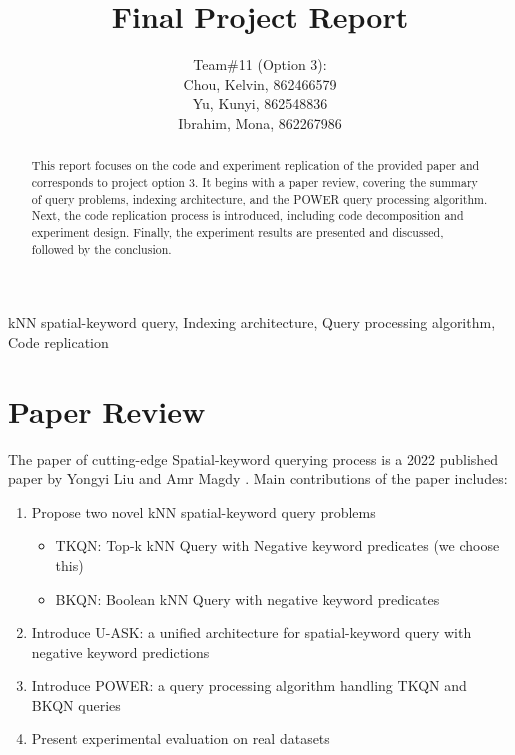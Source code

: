\documentclass[]{IEEEphot}
\begin{document}
\title{Final Project Report}

\author{
    Team\#11 (Option 3):\\
    Chou, Kelvin, 862466579\\
    Yu, Kunyi, 862548836\\
    Ibrahim, Mona, 862267986
}

\maketitle


\begin{abstract}
    This report focuses on the code and experiment replication of the provided paper \cite{ref1-original-paper} and corresponds to project option 3. It begins with a paper review, covering the summary of query problems, indexing architecture, and the POWER query processing algorithm. Next, the code replication process is introduced, including code decomposition and experiment design. Finally, the experiment results are presented and discussed, followed by the conclusion.
\end{abstract}

\begin{IEEEkeywords}
    kNN spatial-keyword query, Indexing architecture, Query processing algorithm, Code replication
\end{IEEEkeywords}

\section{Paper Review}

The paper of cutting-edge Spatial-keyword querying process is a 2022 published paper by Yongyi Liu and Amr Magdy \cite{ref1-original-paper}. Main contributions of the paper includes:

\begin{enumerate}
    \item Propose two novel kNN spatial-keyword query problems
          \begin{itemize}
              \item TKQN: Top-k kNN Query with Negative keyword predicates (we choose this)
              \item BKQN: Boolean kNN Query with negative keyword predicates
          \end{itemize}
    \item Introduce U-ASK: a unified architecture for spatial-keyword query with negative keyword predictions
    \item Introduce POWER: a query processing algorithm handling TKQN and BKQN queries
    \item Present experimental evaluation on real datasets
\end{enumerate}
\end{document}
